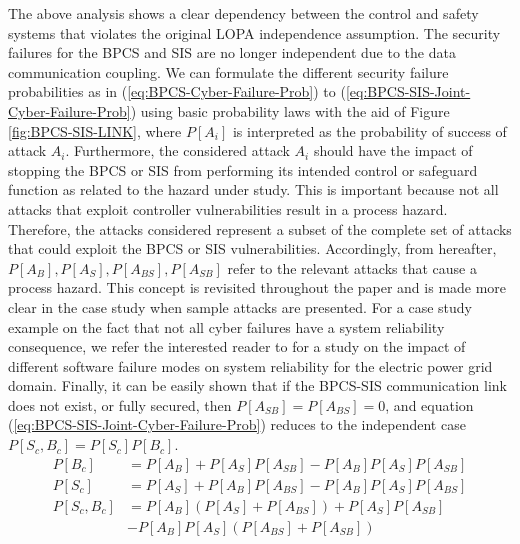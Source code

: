 \documentclass[journal]{IEEEtran}
\begin{document}
The above analysis shows a clear dependency between the control and safety systems that violates the original LOPA independence assumption. The security failures for the BPCS and SIS are no longer independent due to the data communication coupling. We can formulate the different security failure probabilities as in (\ref{eq:BPCS-Cyber-Failure-Prob}) to (\ref{eq:BPCS-SIS-Joint-Cyber-Failure-Prob}) using basic probability laws with the aid of Figure \ref{fig:BPCS-SIS-LINK}, where $P[A_i]$ is interpreted as the probability of success of attack $A_i$. Furthermore, the considered attack $A_i$ should have the impact of stopping the BPCS or SIS from performing its intended control or safeguard function as related to the hazard under study. This is important because not all attacks that exploit controller vulnerabilities result in a process hazard. Therefore, the attacks considered represent a subset of the complete set of attacks that could exploit the BPCS or SIS vulnerabilities. Accordingly, from hereafter, $P[A_B], P[A_S], P[A_{BS}], P[A_{SB}]$ refer to the relevant attacks that cause a process hazard. This concept is revisited throughout the paper and is made more clear in the case study when sample attacks are presented. For a case study example on the fact that not all cyber failures have a system reliability consequence, we refer the interested reader to \cite{faza2009reliability} for a study on the impact of different software failure modes on system reliability for the electric power grid domain. Finally, it can be easily shown that if the BPCS-SIS communication link does not exist, or fully secured, then $P[A_{SB}]=P[A_{BS}]=0$, and equation (\ref{eq:BPCS-SIS-Joint-Cyber-Failure-Prob}) reduces to the independent case $P[S_c,B_c]=P[S_c]P[B_c]$.
\begin{align}
P[B_c] &= P[A_B] + P[A_S]P[A_{SB}] - P[A_B]P[A_S]P[A_{SB}]  \label{eq:BPCS-Cyber-Failure-Prob} \\
P[S_c] &= P[A_S] + P[A_B]P[A_{BS}] - P[A_B]P[A_S]P[A_{BS}]  \label{eq:SIS-Cyber-Failure-Prob} \\
P[S_c,B_c] &= P[A_B](P[A_S] + P[A_{BS}]) + P[A_S]P[A_{SB}] \nonumber \\ &- P[A_B]P[A_S](P[A_{BS}]+P[A_{SB}]) \label{eq:BPCS-SIS-Joint-Cyber-Failure-Prob}
\end{align}
\end{document}
